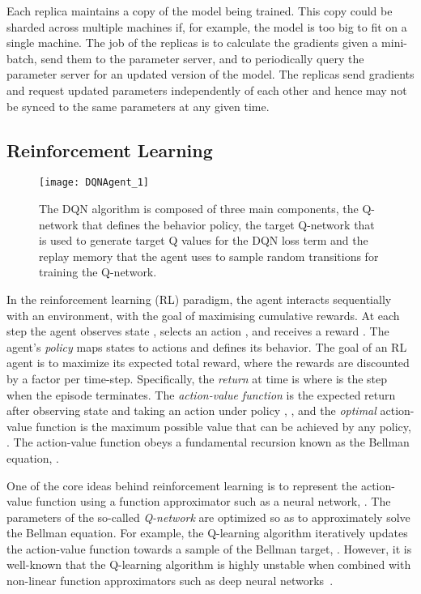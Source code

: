 \documentclass{article}
\begin{document}
Each replica maintains a copy of the model being trained. This copy could be sharded across multiple machines if, for example, the model is too big to fit on a single machine. The job of the replicas is to calculate the gradients given a mini-batch, send them to the parameter server, and to periodically query the parameter server for an updated version of the model. The replicas send gradients and request updated parameters independently of each other and hence may not be synced to the same parameters at any given time. \subsection{Reinforcement Learning}

\begin{figure}[ht]
\begin{center}
        \centerline{\texttt{[image: DQNAgent\_1]}}
        \caption{The DQN algorithm is composed of three main components, the Q-network  that defines the behavior policy, the target Q-network  that is used to generate target Q values for the DQN loss term and the replay memory that the agent uses to sample random transitions for training the Q-network.}
        \label{DQN-figure}
    \end{center}
    \vskip -0.2in
\end{figure}

In the reinforcement learning (RL) paradigm, the agent interacts sequentially with an environment, with the goal of maximising cumulative rewards. At each step  the agent observes state , selects an action , and receives a reward . The agent's \emph{policy}  maps states to actions and defines its behavior. The goal of an RL agent is to maximize its expected total reward, where the rewards are discounted by a factor  per time-step. Specifically, the \emph{return} at time  is   where  is the step when the episode terminates. The \emph{action-value function}  is the expected return after observing state  and taking an action under  policy , , and the \emph{optimal} action-value function is the maximum possible value that can be achieved by any policy, . The action-value function obeys a fundamental recursion known as the Bellman equation, . 

One of the core ideas behind reinforcement learning is to represent the action-value function using a function approximator such as a neural network, . The parameters  of the so-called \emph{Q-network} are optimized so as to approximately solve the Bellman equation. For example, the Q-learning algorithm iteratively updates the action-value function  towards a sample of the Bellman target, . However, it is well-known that the Q-learning algorithm is highly unstable when combined with non-linear function approximators such as deep neural networks~\cite{tsitsiklis-convergence}. 
\end{document}
